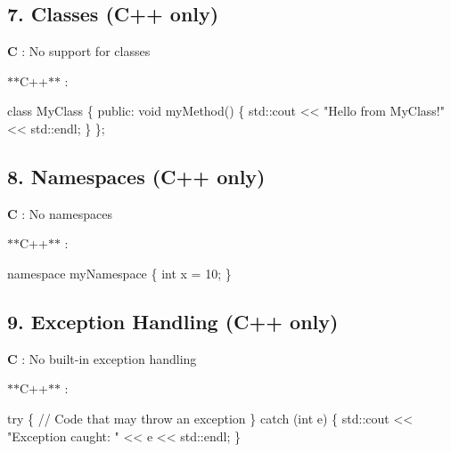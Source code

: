 \subsection*{7. Classes (C++ only)}


\begin{DoxyItemize}
\item {\bfseries C} \+: No support for classes
\item $\ast$$\ast$\+C++$\ast$$\ast$ \+: 
\begin{DoxyCode}
\textcolor{keyword}{class }MyClass \{
\textcolor{keyword}{public}:
    \textcolor{keywordtype}{void} myMethod() \{
        std::cout << \textcolor{stringliteral}{"Hello from MyClass!"} << std::endl;
    \}
\};
\end{DoxyCode}

\end{DoxyItemize}

\subsection*{8. Namespaces (C++ only)}


\begin{DoxyItemize}
\item {\bfseries C} \+: No namespaces
\item $\ast$$\ast$\+C++$\ast$$\ast$ \+: 
\begin{DoxyCode}
\textcolor{keyword}{namespace }myNamespace \{
    \textcolor{keywordtype}{int} x = 10;
\}
\end{DoxyCode}

\end{DoxyItemize}

\subsection*{9. Exception Handling (C++ only)}


\begin{DoxyItemize}
\item {\bfseries C} \+: No built-\/in exception handling
\item $\ast$$\ast$\+C++$\ast$$\ast$ \+: 
\begin{DoxyCode}
\textcolor{keywordflow}{try} \{
    \textcolor{comment}{// Code that may throw an exception}
\} \textcolor{keywordflow}{catch} (\textcolor{keywordtype}{int} e) \{
    std::cout << \textcolor{stringliteral}{"Exception caught: "} << e << std::endl;
\}
\end{DoxyCode}

\end{DoxyItemize}

